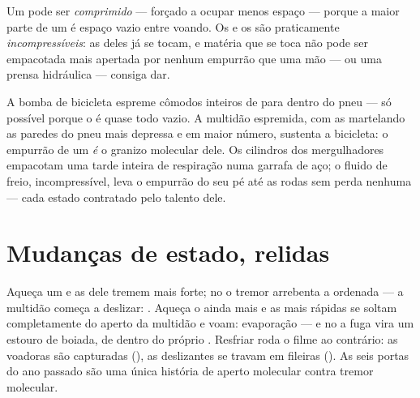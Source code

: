 \begin{proposition}\label{prop:g7:states-of-matter:squeeze}
Um  pode ser \emph{comprimido} --- forçado a
ocupar menos espaço --- porque a maior parte de um  é espaço vazio
entre  voando. Os  e os  são praticamente
\emph{incompressíveis}: as  deles já se tocam, e matéria que
se toca não pode ser empacotada mais apertada por nenhum empurrão que
uma mão --- ou uma prensa hidráulica --- consiga dar.
\end{proposition}

\begin{example}\label{ex:g7:states-of-matter:squeezed}
A bomba de bicicleta espreme cômodos inteiros de  para dentro do
pneu --- só possível porque o  é quase todo vazio. A multidão
espremida, com as  martelando as paredes do pneu mais
depressa e em maior número, sustenta a bicicleta: o empurrão de um
 \emph{é} o granizo molecular dele. Os cilindros dos mergulhadores
empacotam uma tarde inteira de respiração numa garrafa de aço; o
fluido de freio, incompressível, leva o empurrão do seu pé até as
rodas sem perda nenhuma --- cada estado contratado pelo talento
dele.
\end{example}

\section{Mudanças de estado, relidas}

\begin{example}\label{ex:g7:states-of-matter:doors}
Aqueça um  e as  dele tremem mais forte; no  o tremor arrebenta a  ordenada --- a multidão começa a
deslizar: . Aqueça o  ainda mais e as  mais
rápidas se soltam completamente do aperto da multidão e voam:
evaporação --- e no  a fuga vira um estouro de
boiada, de dentro do próprio . Resfriar roda o filme ao
contrário: as voadoras são capturadas (), as deslizantes
se travam em fileiras (). As seis portas do ano passado
são uma única história de aperto molecular contra tremor molecular.
\end{example}

